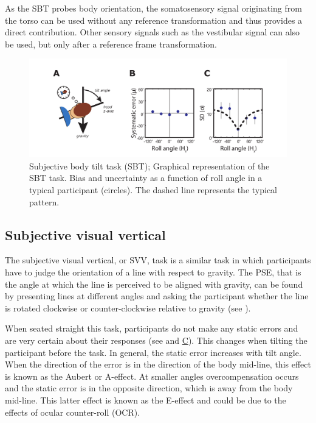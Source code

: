 As the SBT probes body orientation, the somatosensory signal originating from the torso can be used without any reference transformation and thus provides a direct contribution. Other sensory signals such as the vestibular signal can also be used, but only after a reference frame transformation.

\begin{figure}
    \includegraphics[width=1.0\textwidth]{src/intro/figures/sbt.pdf}

    \caption{Subjective body tilt task (SBT);  Graphical representation of the SBT task.  Bias and  uncertainty as a function of roll angle in a typical participant (circles). The dashed line represents the typical pattern.}
    \label{intro:fig4}
\end{figure}


\subsection{Subjective visual vertical}
The subjective visual vertical, or SVV, task is a similar task in which participants have to judge the orientation of a line with respect to gravity. The PSE, that is the angle at which the line is perceived to be aligned with gravity, can be found by presenting lines at different angles and asking the participant whether the line is rotated clockwise or counter-clockwise relative to gravity (see ).

When seated straight this task, participants do not make any static errors and are very certain about their responses (see  and \hyperref[intro:fig5]{C}). This changes when tilting the participant before the task. In general, the static error increases with tilt angle. When the direction of the error is in the direction of the body mid-line, this effect is known as the Aubert or A-effect. At smaller angles overcompensation occurs and the static error is in the opposite direction, which is away from the body mid-line. This latter effect is known as the E-effect and could be due to the effects of ocular counter-roll (OCR).


